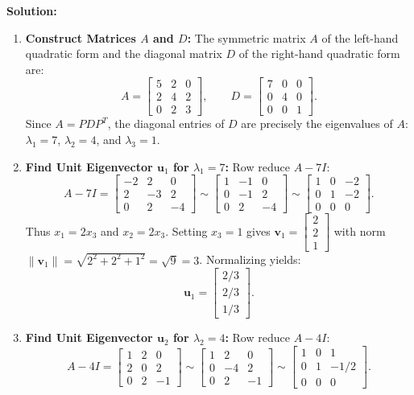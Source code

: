 \documentclass[11pt, letterpaper]{article}
\theoremstyle{definition}
\theoremstyle{remark}
\begin{document}
\textbf{Solution:}
\begin{enumerate}[label=\textbf{Step \arabic*:}]
    \item \textbf{Construct Matrices $A$ and $D$:}
    The symmetric matrix $A$ of the left-hand quadratic form and the diagonal matrix $D$ of the right-hand quadratic form are:
    \[
    A = \begin{bmatrix} 5 & 2 & 0 \\ 2 & 4 & 2 \\ 0 & 2 & 3 \end{bmatrix}, \qquad D = \begin{bmatrix} 7 & 0 & 0 \\ 0 & 4 & 0 \\ 0 & 0 & 1 \end{bmatrix}.
    \]
    Since $A = P D P^T$, the diagonal entries of $D$ are precisely the eigenvalues of $A$: $\lambda_1 = 7$, $\lambda_2 = 4$, and $\lambda_3 = 1$.
    \item \textbf{Find Unit Eigenvector $\mathbf{u}_1$ for $\lambda_1 = 7$:}
    Row reduce $A - 7I$:
    \[
    A - 7I = \begin{bmatrix} -2 & 2 & 0 \\ 2 & -3 & 2 \\ 0 & 2 & -4 \end{bmatrix} \sim \begin{bmatrix} 1 & -1 & 0 \\ 0 & -1 & 2 \\ 0 & 2 & -4 \end{bmatrix} \sim \begin{bmatrix} 1 & 0 & -2 \\ 0 & 1 & -2 \\ 0 & 0 & 0 \end{bmatrix}.
    \]
    Thus $x_1 = 2x_3$ and $x_2 = 2x_3$. Setting $x_3 = 1$ gives $\mathbf{v}_1 = \begin{bmatrix} 2 \\ 2 \\ 1 \end{bmatrix}$ with norm $\|\mathbf{v}_1\| = \sqrt{2^2 + 2^2 + 1^2} = \sqrt{9} = 3$. Normalizing yields:
    \[
    \mathbf{u}_1 = \begin{bmatrix} 2/3 \\ 2/3 \\ 1/3 \end{bmatrix}.
    \]
    \item \textbf{Find Unit Eigenvector $\mathbf{u}_2$ for $\lambda_2 = 4$:}
    Row reduce $A - 4I$:
    \[
    A - 4I = \begin{bmatrix} 1 & 2 & 0 \\ 2 & 0 & 2 \\ 0 & 2 & -1 \end{bmatrix} \sim \begin{bmatrix} 1 & 2 & 0 \\ 0 & -4 & 2 \\ 0 & 2 & -1 \end{bmatrix} \sim \begin{bmatrix} 1 & 0 & 1 \\ 0 & 1 & -1/2 \\ 0 & 0 & 0 \end{bmatrix}.
\]
\end{enumerate}
\end{document}
